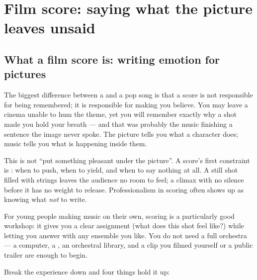 \chapter{Film score: saying what the picture leaves unsaid}
\label{ch:genre-film-deep}


\section{What a film score is: writing emotion for pictures}
\label{sec:film-what}

The biggest difference between a  and a pop song is that a score is not responsible for being remembered; it is responsible for making you believe. You may leave a cinema unable to hum the theme, yet you will remember exactly why a shot made you hold your breath --- and that was probably the music finishing a sentence the image never spoke. The picture tells you what a character does; music tells you what is happening inside them.

This is not ``put something pleasant under the picture''. A score's first constraint is : when to push, when to yield, and when to say nothing at all. A still shot filled with strings leaves the audience no room to feel; a climax with no silence before it has no weight to release. Professionalism in scoring often shows up as knowing what \emph{not} to write.

For young people making music on their own, scoring is a particularly good workshop: it gives you a clear assignment (what does this shot feel like?) while letting you answer with any ensemble you like. You do not need a full orchestra --- a computer, a , an orchestral library, and a clip you filmed yourself or a public trailer are enough to begin.

Break the experience down and four things hold it up:

